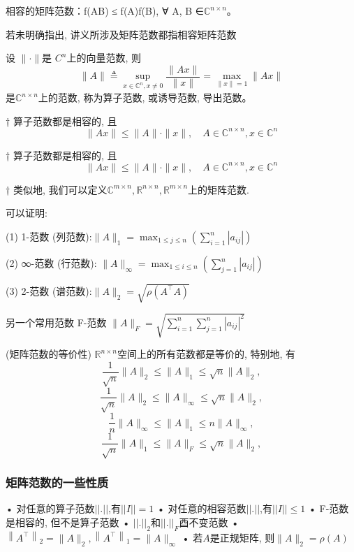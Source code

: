 \documentclass[12pt,a4paper]{article}
\begin{document}
相容的矩阵范数：f(AB) ≤ f(A)f(B), ∀ A, B ∈$\mathbb{C}^{n×n}$。


若未明确指出, 讲义所涉及矩阵范数都指相容矩阵范数



\begin{lemma}
	设 $∥ · ∥ $是 $C^{n}$上的向量范数, 则
	$$
	\|A\| \triangleq \sup _{x \in \mathbb{C}^{n}, x \neq 0} \frac{\|A x\|}{\|x\|}=\max _{\|x\|=1}\|A x\|
	$$
	是$\mathbb{C}
	^{n×n} $上的范数, 称为算子范数, 或诱导范数, 导出范数。
\end{lemma}



† 算子范数都是相容的, 且$$ \|A x\| \leq\|A\| \cdot\|x\|, \quad A \in \mathbb{C}^{n \times n}, x \in \mathbb{C}^{n}$$



† 算子范数都是相容的, 且$$ \|A x\| \leq\|A\| \cdot\|x\|, \quad A \in \mathbb{C}^{n \times n}, x \in \mathbb{C}^{n}$$



† 类似地, 我们可以定义$\mathbb{C}^{m \times n}, \mathbb{R}^{n \times n}, \mathbb{R}^{m \times n}$上的矩阵范数.



\begin{lemma}
	可以证明:
	
	(1) 1-范数 (列范数):$\|A\|_{1}=\max _{1 \leq j \leq n}\left(\sum_{i=1}^{n}\left|a_{i j}\right|\right)$
	
	(2) ∞-范数 (行范数): $\|A\|_{\infty}=\max _{1 \leq i \leq n}\left(\sum_{j=1}^{n}\left|a_{i j}\right|\right)$
	
	(3) 2-范数 (谱范数):$\|A\|_{2}=\sqrt{\rho\left(A^{\top} A\right)}$
	
\end{lemma}


另一个常用范数 F-范数 $\|A\|_{F}=\sqrt{\sum_{i=1}^{n} \sum_{j=1}^{n}\left|a_{i j}\right|^{2}}$


\begin{theorem}(矩阵范数的等价性)
	$\mathbb{R}^{n×n}$空间上的所有范数都是等价的, 特别地, 有
	$$
	\frac{1}{\sqrt{n}}\|A\|_{2} \leq\|A\|_{1} \leq \sqrt{n}\|A\|_{2},
	$$
	$$
	\frac{1}{\sqrt{n}}\|A\|_{2} \leq\|A\|_{\infty} \leq \sqrt{n}\|A\|_{2},
	$$
	$$
	\frac{1}{n}\|A\|_{\infty} \leq\|A\|_{1} \leq n\|A\|_{\infty}
	,
	$$
	$$
	\frac{1}{\sqrt{n}}\|A\|_{1} \leq\|A\|_{F} \leq \sqrt{n}\|A\|_{2}
	,
	$$
\end{theorem}


\subsubsection{矩阵范数的一些性质}
• 对任意的算子范数$||.||$,有$||I|| = 1$
• 对任意的相容范数$||.||$,有$||I|| \leq 1$ 
• F-范数是相容的, 但不是算子范数
• $||.||_2$和$||.||_F$酉不变范数
• $\left\|A^{\top}\right\|_{2}=\|A\|_{2},\left\|A^{\top}\right\|_{1}=\|A\|_{\infty}$
• 若$A$是正规矩阵, 则$\|A\|_{2}=\rho(A)$
\end{document}
